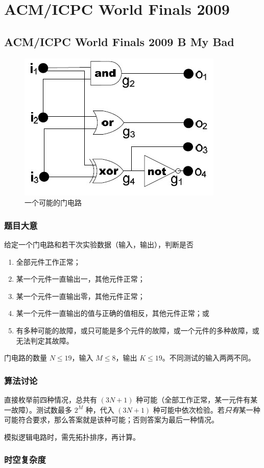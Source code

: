 
	\section{ACM/ICPC World Finals 2009}
		\subsection{ACM/ICPC World Finals 2009 B My Bad}
				\begin{figure}
					\centering
					\includegraphics[width=0.3 \textwidth]{7.jpg}
					\caption{一个可能的门电路}
				\end{figure}
			\subsubsection{题目大意}
				给定一个门电路和若干次实验数据（输入，输出），判断是否
				\begin{enumerate}
					\item 全部元件工作正常；
					\item 某一个元件一直输出一，其他元件正常；
					\item 某一个元件一直输出零，其他元件正常；
					\item 某一个元件一直输出的值与正确的值相反，其他元件正常；或
					\item 有多种可能的故障，或只可能是多个元件的故障，或一个元件的多种故障，或无法判定其故障。
				\end{enumerate}
				
				门电路的数量 $N \le 19$，输入 $M \le 8$，输出 $K \le 19$。不同测试的输入两两不同。
			\subsubsection{算法讨论}
				直接枚举前四种情况，总共有 $(3 N + 1)$ 种可能（全部工作正常，某一元件有某一故障）。测试数最多 $2^M$ 种，代入  $(3 N + 1)$ 种可能中依次检验。若\emph{只有}某一种可能符合要求，那么答案就是该种可能；否则答案为最后一种情况。
				
				模拟逻辑电路时，需先拓扑排序，再计算。
			\subsubsection{时空复杂度}
				
